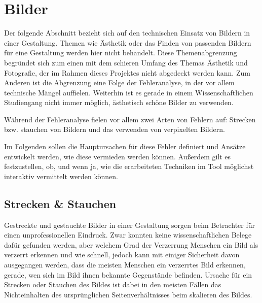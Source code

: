 
\chapter{Bilder} %

\label{Bilder} %



Der folgende Abschnitt bezieht sich auf den technischen Einsatz von Bildern in einer Gestaltung. Themen wie Ästhetik oder das Finden von passenden Bildern für eine Gestaltung werden hier nicht behandelt.
Diese Themenabgrenzung begründet sich zum einen mit dem schieren Umfang des Themas Ästhetik und Fotografie, der im Rahmen dieses Projektes nicht abgedeckt werden kann. Zum Anderen ist die Abgrenzung eine Folge der Fehleranalyse, in der vor allem technische Mängel auffielen. Weiterhin ist es gerade in einem Wissenschaftlichen Studiengang nicht immer möglich, ästhetisch schöne Bilder zu verwenden.

Während der Fehleranalyse fielen vor allem zwei Arten von Fehlern auf: Strecken bzw. stauchen von Bildern und das verwenden von verpixelten Bildern.

Im Folgenden sollen die Hauptursachen für diese Fehler definiert und Ansätze entwickelt werden, wie diese vermieden werden können. Außerdem gilt es festzustellen, ob, und wenn ja, wie die erarbeiteten Techniken im Tool möglichst interaktiv vermittelt werden können.

\section{Strecken \& Stauchen}
Gestreckte und gestauchte Bilder in einer Gestaltung sorgen beim Betrachter für einen unprofessionellen Eindruck.
Zwar konnten keine wissenschaftlichen Belege dafür gefunden werden, aber welchem Grad der Verzerrung Menschen ein Bild als verzerrt erkennen und wie schnell, jedoch kann mit einiger Sicherheit davon ausgegangen werden, dass die meisten Menschen ein verzerrtes Bild erkennen, gerade, wen sich im Bild ihnen bekannte Gegenstände befinden.
Ursache für ein Strecken oder Stauchen des Bildes ist dabei in den meisten Fällen das Nichteinhalten des ursprünglichen Seitenverhältnisses beim skalieren des Bildes.

